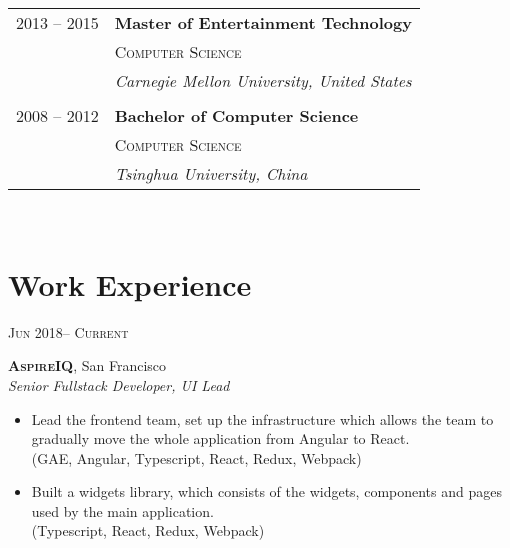 \documentclass[10pt]{article}
\begin{document}
{\begin{minipage}[t]{0.5\textwidth}
\begin{tabular}{rl}
2013 -- 2015 & \textbf{Master of Entertainment Technology} \\ 
& \textsc{Computer Science} \\ 
& \textit{Carnegie Mellon University, United States}\\
&\\


2008 -- 2012 & \textbf{Bachelor of Computer Science}\\
& \textsc{Computer Science} \\
& \textit{Tsinghua University, China} 
	

\end{tabular}\\[10pt]
	

\section{Work Experience} 

{\raggedleft\textsc{Jun 2018-- Current}\par}

{\raggedright\large \textbf{\textsc{AspireIQ}}, San Francisco\\
\textit{Senior Fullstack Developer, UI Lead}\\[5pt]}

\begin{itemize}
	\item Lead the frontend team, set up the infrastructure which allows the team to gradually move the whole application from Angular to React. \\
	{\color{Mahogany}(GAE, Angular, Typescript, React, Redux, Webpack)}
	\item Built a widgets library, which consists of the widgets, components and pages used by the main application. \\
	{\color{Mahogany}(Typescript, React, Redux, Webpack)}
\end{itemize}


\end{minipage}}
\end{document}
